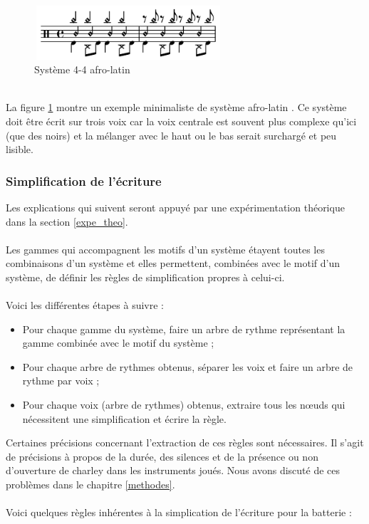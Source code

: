 \begin{figure}[h]
	\centering
	\includegraphics[height=20mm, width=70mm]{z_images/3_methodes/2_systemes/3_separation_afro-latins.png}
	\caption{Système 4-4 afro-latin}
	\label{afro_latin}
\end{figure}\\
La figure \ref{afro_latin} montre un exemple minimaliste de système afro-latin \cite{system_drums}. Ce système doit être écrit sur trois voix car la voix centrale est souvent plus complexe qu’ici (que des noirs) et la mélanger avec le haut ou le bas serait surchargé et peu lisible.
\subsubsection{Simplification de l’écriture}
Les explications qui suivent seront appuyé par une expérimentation théorique dans la section \ref{expe_theo}.\\\\
Les gammes qui accompagnent les motifs d’un système étayent toutes les combinaisons d’un système et elles permettent, combinées avec le motif d’un système, de définir les règles de simplification propres à celui-ci.\\\\
Voici les différentes étapes à suivre :
\begin{itemize}
	\item Pour chaque gamme du système, faire un arbre de rythme représentant la gamme combinée avec le motif du système ;
	\item Pour chaque arbre de rythmes obtenus, séparer les voix et faire un arbre de rythme par voix ;
	\item Pour chaque voix (arbre de rythmes) obtenus, extraire tous les nœuds qui nécessitent une simplification et écrire la règle.\\
\end{itemize}
Certaines précisions concernant l’extraction de ces règles sont nécessaires. Il s’agit de précisions à propos de la durée, des silences et de la présence ou non d’ouverture de charley dans les instruments joués. Nous avons discuté de ces problèmes dans le chapitre \ref{methodes}.\\\\
Voici quelques règles inhérentes à la simplication de l’écriture pour la batterie :\\
